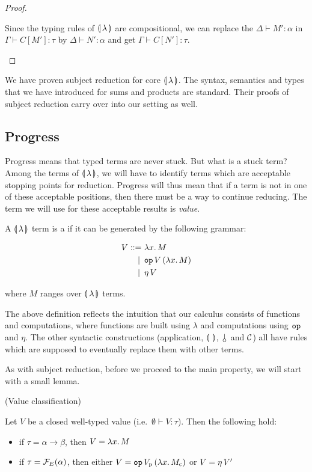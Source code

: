 \begin{proof}
\begin{itemize}
    Since the typing rules of $\llparenthesis \, \lambda \, \rrparenthesis$ are compositional, we can
    replace the $\Delta \vdash M' : \alpha$ in $\Gamma \vdash C[M'] : \tau$
    by $\Delta \vdash N' : \alpha$ and get $\Gamma \vdash C[N'] : \tau$.
  \end{itemize}
\end{proof}

We have proven subject reduction for core $\llparenthesis \, \lambda \, \rrparenthesis$. The syntax,
semantics and types that we have introduced for sums and products are
standard. Their proofs of subject reduction carry over into our setting as
well.


\subsection{Progress}
\label{ssec:progress}

Progress means that typed terms are never stuck. But what is a stuck term?
Among the terms of $\llparenthesis \, \lambda \, \rrparenthesis$, we will have to identify terms which
are acceptable stopping points for reduction. Progress will thus mean that
if a term is not in one of these acceptable positions, then there must be a
way to continue reducing. The term we will use for these acceptable results
is \emph{value}.

\begin{definition}
  A $\llparenthesis \, \lambda \, \rrparenthesis$ term is a  if it can be generated by
  the following grammar:

\begin{align*}
  V ::= &\ \lambda x.\, M \\
   | \, &\ \mathtt{op}\,V\,(\lambda x.\, M) \\
   | \, &\ \eta\,V
\end{align*}

  where $M$ ranges over $\llparenthesis \, \lambda \, \rrparenthesis$ terms.
\end{definition}

The above definition reflects the intuition that our calculus consists of
functions and computations, where functions are built using $\lambda$ and
computations using $\mathtt{op}$ and $\eta$. The other syntactic constructions
(application, $\llparenthesis \,  \, \rrparenthesis$, $\cherry$ and $\mathcal{C}$) all have rules which are
supposed to eventually replace them with other terms.

As with subject reduction, before we proceed to the main property, we will
start with a small lemma.

\begin{lemma}\label{lem:value-classification}
  (Value classification)

  Let $V$ be a closed well-typed value (i.e.\ $\emptyset \vdash V :
  \tau$). Then the following hold:

  \begin{itemize}
  \item if $\tau = \alpha \to \beta$, then $V = \lambda x.\, M$
  \item if $\tau = \mathcal{F}_E(\alpha)$, then either
    $V = \mathtt{op}\,V_{\mathrm{p}}\,(\lambda x.\, M_{\mathrm{c}})$ or $V = \eta\,V'$
  \end{itemize}
\end{lemma}

